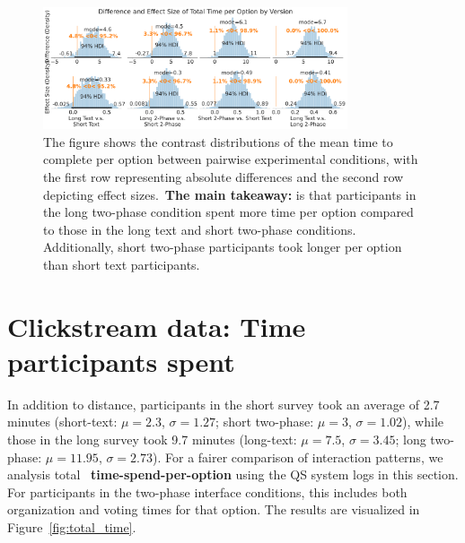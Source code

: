 \begin{figure}[ht!]
    \centering
    \includegraphics[width=0.8\textwidth]{content/image/time/time_diff_per_option_effect_size_by_version}
    \caption{The figure shows the contrast distributions of the mean time to complete per option between pairwise experimental conditions, with the first row representing absolute differences and the second row depicting effect sizes.~\textbf{The main takeaway:} is that participants in the long two-phase condition spent more time per option compared to those in the long text and short two-phase conditions. Additionally, short two-phase participants took longer per option than short text participants.}
    \label{fig:time_per_option_bayesian}
\end{figure}


\section{Clickstream data: Time participants spent}
\label{sec:timeAnalysis}
In addition to distance, participants in the short survey took an average of 2.7 minutes (short-text: $\mu=2.3$, $\sigma=1.27$; short two-phase: $\mu=3$, $\sigma=1.02$), while those in the long survey took 9.7 minutes (long-text: $\mu=7.5$, $\sigma=3.45$; long two-phase: $\mu=11.95$, $\sigma=2.73$). For a fairer comparison of interaction patterns, we analysis total ~\textbf{time-spend-per-option} using the QS system logs in this section. For participants in the two-phase interface conditions, this includes both organization and voting times for that option. The results are visualized in Figure~\ref{fig:total_time}.

